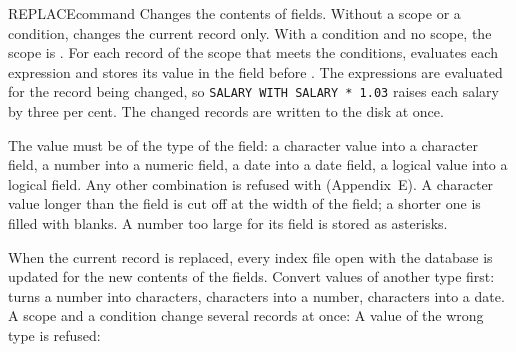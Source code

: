 \begin{XbaseEntry}{REPLACE}{command}
Changes the contents of fields.
\Syntax
{}
\Defaults
Without a scope or a condition,  changes the current record
only.  With a  condition and no scope, the scope is .
\Usage
For each record of the scope that meets the conditions, 
evaluates each expression and stores its value in the field before
.  The expressions are evaluated for the record being changed, so
\texttt{SALARY WITH SALARY * 1.03} raises each salary by three per cent.  The
changed records are written to the disk at once.

The value must be of the type of the field: a character value into a
character field, a number into a numeric field, a date into a date field, a
logical value into a logical field.
  Any other combination is
refused with  (Appendix~E).  A character value
longer than the field is cut off at the width of the field; a shorter one is
filled with blanks.  A number too large for its field is stored as asterisks.

When the current record is replaced, every index file open with the database
is updated for the new contents of the fields.
\Tips
Convert values of another type first:  turns a number into
characters,  characters into a number,  characters into
a date.
\Examples
{}
A scope and a condition change several records at once:
A value of the wrong type is refused:
\end{XbaseEntry}

